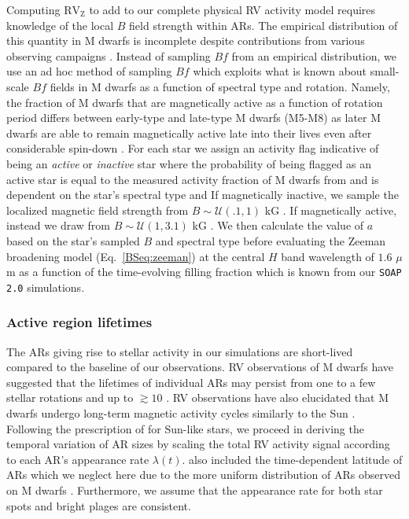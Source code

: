 Computing $\text{RV}_{\text{Z}}$ to add to our complete physical RV activity model requires knowledge of the
local $B$ field strength within
ARs. The empirical distribution of this quantity in M dwarfs is incomplete despite contributions from
various observing campaigns \citep[e.g.][]{reiners07, shulyak14, hebrard16, moutou17, shulyak17}. 
Instead of sampling $Bf$ from an empirical distribution, we use an ad hoc method of sampling $Bf$ which
exploits what is known about small-scale $Bf$
fields in M dwarfs as a function of spectral type and rotation. Namely, the fraction of M dwarfs
that are magnetically active as a function of rotation period differs between early-type
and late-type M dwarfs (M5-M8) as later M dwarfs are able to remain magnetically
active late into their lives even after considerable spin-down \citep{west15}. For each star we assign an
activity flag indicative of being an \emph{active} or \emph{inactive} star where the probability of being
flagged as an active star is equal to the measured activity fraction of M dwarfs from \cite{west15} and 
is dependent on the star's spectral type and  If magnetically inactive, we sample the localized
magnetic field strength from $B \sim \mathcal{U}(.1,1)$ kG \citep{moutou17}. If magnetically active, instead
we draw from $B \sim \mathcal{U}(1,3.1)$ kG \citep{moutou17}. We then calculate the value of $a$ based on the
star's sampled $B$ and spectral type before evaluating the Zeeman broadening model (Eq.~\ref{BSeq:zeeman}) at the
central $H$ band wavelength of $1.6$ $\mu$m as a function of the time-evolving filling fraction which is known
from our \texttt{SOAP 2.0} simulations.


\subsubsection{Active region lifetimes} \label{BSsect:lifetimes}
The ARs giving rise to stellar activity in our simulations are short-lived compared to the baseline
of our observations. RV observations of M dwarfs have suggested that the lifetimes of individual ARs
may persist from one to a few stellar rotations and up to $\gtrsim 10$
\citep[e.g.][]{bonfils07,forveille09,hebrard16}. RV observations have also elucidated that M dwarfs undergo
long-term magnetic
activity cycles similarly to the Sun \citep[e.g.][]{gomesdasilva12, route16}. Following the prescription
of \cite{dumusque16a} for Sun-like stars, we proceed in deriving the temporal variation of AR sizes by scaling the
total RV activity signal according to each AR's appearance rate $\lambda(t)$. \cite{dumusque16a} also included
the time-dependent latitude of ARs which we neglect here due to the more uniform distribution of ARs observed
on M dwarfs \citep{barnes01, barnes04}. Furthermore, we assume that the appearance rate for both star spots and
bright plages are consistent. \\

